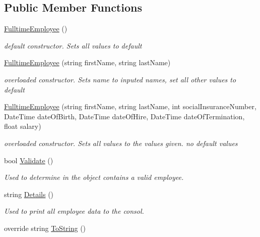 \subsection*{Public Member Functions}
\begin{DoxyCompactItemize}
\item 
\hyperlink{class_all_employees_1_1_fulltime_employee_a2f7744fed20aa3161c5ac5cd37c1a281}{Fulltime\+Employee} ()
\begin{DoxyCompactList}\small\item\em default constructor. Sets all values to default \end{DoxyCompactList}\item 
\hyperlink{class_all_employees_1_1_fulltime_employee_a7cc8db6b3e7dd2fa71706c9ebaf68660}{Fulltime\+Employee} (string first\+Name, string last\+Name)
\begin{DoxyCompactList}\small\item\em overloaded constructor. Sets name to inputed names, set all other values to default \end{DoxyCompactList}\item 
\hyperlink{class_all_employees_1_1_fulltime_employee_abf4afc245af7d4d99452ef6251415317}{Fulltime\+Employee} (string first\+Name, string last\+Name, int social\+Insurance\+Number, Date\+Time date\+Of\+Birth, Date\+Time date\+Of\+Hire, Date\+Time date\+Of\+Termination, float salary)
\begin{DoxyCompactList}\small\item\em overloaded constructor. Sets all values to the values given. no default values \end{DoxyCompactList}\item 
bool \hyperlink{class_all_employees_1_1_fulltime_employee_a3e718749e4730c0f2a28f820530071da}{Validate} ()
\begin{DoxyCompactList}\small\item\em Used to determine in the object contains a valid employee. \end{DoxyCompactList}\item 
string \hyperlink{class_all_employees_1_1_fulltime_employee_a7660032e944e78c6ff26598aa7107796}{Details} ()
\begin{DoxyCompactList}\small\item\em Used to print all employee data to the consol. \end{DoxyCompactList}\item 
override string \hyperlink{class_all_employees_1_1_fulltime_employee_a3026e5a4c764fc0da54873cc131e2b82}{To\+String} ()

\end{DoxyCompactItemize}
